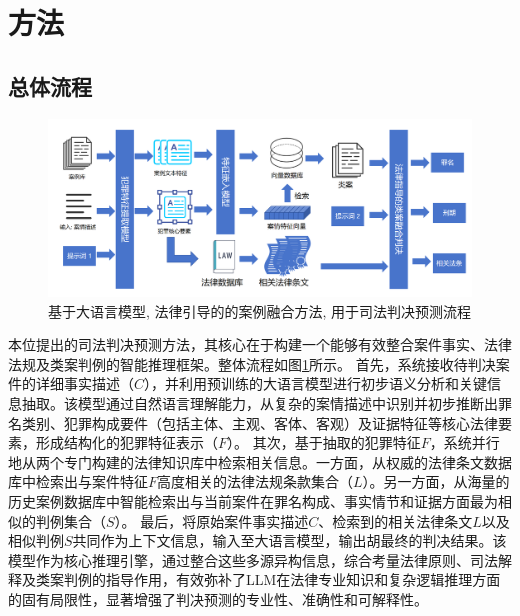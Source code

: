 \section{\heiti 方法}
\subsection{\heiti 总体流程}
\begin{multicols}{1}
	\begin{figure}[H]
		\centering
		\includegraphics[width=1\textwidth]{fig/main.png}
		\caption{基于大语言模型, 法律引导的的案例融合方法, 用于司法判决预测流程}
		\label{fig:main}
	\end{figure}
\end{multicols}
本位提出的司法判决预测方法，其核心在于构建一个能够有效整合案件事实、法律法规及类案判例的智能推理框架。整体流程如图\ref{fig:main}所示。
首先，系统接收待判决案件的详细事实描述（$C$），并利用预训练的大语言模型进行初步语义分析和关键信息抽取。该模型通过自然语言理解能力，从复杂的案情描述中识别并初步推断出罪名类别、犯罪构成要件（包括主体、主观、客体、客观）及证据特征等核心法律要素，形成结构化的犯罪特征表示（$F$）。
其次，基于抽取的犯罪特征$F$，系统并行地从两个专门构建的法律知识库中检索相关信息。一方面，从权威的法律条文数据库中检索出与案件特征$F$高度相关的法律法规条款集合（$L$）。另一方面，从海量的历史案例数据库中智能检索出与当前案件在罪名构成、事实情节和证据方面最为相似的判例集合（$S$）。
最后，将原始案件事实描述$C$、检索到的相关法律条文$L$以及相似判例$S$共同作为上下文信息，输入至大语言模型，输出胡最终的判决结果。该模型作为核心推理引擎，通过整合这些多源异构信息，综合考量法律原则、司法解释及类案判例的指导作用，有效弥补了LLM在法律专业知识和复杂逻辑推理方面的固有局限性，显著增强了判决预测的专业性、准确性和可解释性。